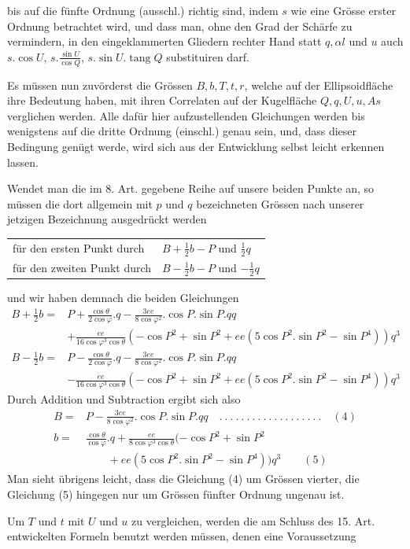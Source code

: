 %
bis auf die fünfte Ordnung (ausschl.) richtig sind, indem \(s\) wie eine Grösse erster Ordnung betrachtet wird, und dass man, ohne den Grad der Schärfe zu vermindern, in den eingeklammerten Gliedern rechter Hand statt \(q,\alpha l\) und \(u\) auch \(s\mathord{.}\cos U\), \(s\mathord{.}\frac{\sin U}{\cos Q}\), \(s\mathord{.}\sin U\mathord{.}\operatorname{tang}Q\) substituiren darf.

Es müssen nun zuvörderst die Grössen \(B,b,T,t,r\), welche auf der Ellipsoidfläche ihre Bedeutung haben, mit ihren Correlaten auf der Kugelfläche \(Q,q,U,u,As\) verglichen werden. Alle dafür hier aufzustellenden Gleichungen werden bis wenigstens auf die dritte Ordnung (einschl.) genau sein, und, dass dieser Bedingung genügt werde, wird sich aus der Entwicklung selbst leicht erkennen lassen.

Wendet man die im 8. Art. gegebene Reihe auf unsere beiden Punkte an, so müssen die dort allgemein mit \(p\) und \(q\) bezeichneten Grössen nach unserer jetzigen Bezeichnung ausgedrückt werden
\begin{center}
\begin{tabular}{ll}
für den ersten Punkt durch & \(B+\frac12b-P\) und \(\frac12q\)\\
für den zweiten Punkt durch & \(B-\frac12b-P\) und \(-\frac12q\)
\end{tabular}
\end{center}
und wir haben demnach die beiden Gleichungen
\begingroup\fontsize{10}{12}\selectfont
\[
\begin{aligned}
B+\tfrac12b={}&P+\frac{\cos\theta}{2\cos\varphi}\mathord{.}q-\frac{3ee}{8\cos\varphi^2}\mathord{.}\cos P\mathord{.}\sin P\mathord{.}qq\\
&+\frac{ee}{16\cos\varphi^3\cos\theta}(-\cos P^2+\sin P^2+ee(5\cos P^2\mathord{.}\sin P^2-\sin P^4))q^3\\
B-\tfrac12b={}&P-\frac{\cos\theta}{2\cos\varphi}\mathord{.}q-\frac{3ee}{8\cos\varphi^2}\mathord{.}\cos P\mathord{.}\sin P\mathord{.}qq\\
&-\frac{ee}{16\cos\varphi^3\cos\theta}(-\cos P^2+\sin P^2+ee(5\cos P^2\mathord{.}\sin P^2-\sin P^4))q^3
\end{aligned}
\]
\endgroup
Durch Addition und Subtraction ergibt sich also
\[
\begin{aligned}
B={}&P-\frac{3ee}{8\cos\varphi^2}\mathord{.}\cos P\mathord{.}\sin P\mathord{.}qq\quad .\ .\ .\ .\ .\ .\ .\ .\ .\ .\ .\ .\ .\ .\ .\ .\ .\ .\ .\quad(4)\\
b={}&\frac{\cos\theta}{\cos\varphi}\mathord{.}q+\frac{ee}{8\cos\varphi^3\cos\theta}(-\cos P^2+\sin P^2\\
&\qquad+ee(5\cos P^2\mathord{.}\sin P^2-\sin P^4))q^3\qquad(5)
\end{aligned}
\]
Man sieht übrigens leicht, dass die Gleichung (4) um Grössen vierter, die Gleichung (5) hingegen nur um Grössen fünfter Ordnung ungenau ist.

Um \(T\) und \(t\) mit \(U\) und \(u\) zu vergleichen, werden die am Schluss des 15. Art. entwickelten Formeln benutzt werden müssen, denen eine Voraussetzung

